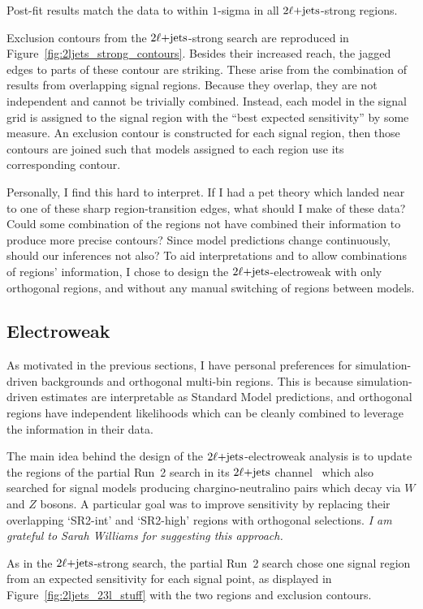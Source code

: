 Post-fit results match the data to within $1$-sigma in all $2\ell\mathrm{+jets}$-strong
regions.

Exclusion contours from the $2\ell\mathrm{+jets}$-strong search are reproduced in
Figure~\ref{fig:2ljets_strong_contours}.
Besides their increased reach, the jagged edges to parts of these contour are
striking.
These arise from the combination of results from overlapping signal regions.
Because they overlap, they are not independent and cannot be trivially
combined.
Instead, each model in the signal grid is assigned to the signal region
with the ``best expected sensitivity'' by some measure.
An exclusion contour is constructed for each signal region, then those contours
are joined such that models assigned to each region use its corresponding
contour.

Personally, I find this hard to interpret.
If I had a pet theory which landed near to one of these sharp
region-transition edges, what should I make of these data?
Could some combination of the regions not have combined their information to
produce more precise contours?
Since model predictions change continuously, should our inferences not also?
To aid interpretations and to allow combinations of regions'
information, I chose to design the $2\ell\mathrm{+jets}$-electroweak with only orthogonal
regions, and without any manual switching of regions between models.


\subsection{Electroweak}
\label{sec:2ljets_origins_electroweak}
As motivated in the previous sections, I have personal preferences for
simulation-driven backgrounds and orthogonal multi-bin regions.
This is because simulation-driven estimates are interpretable as
Standard Model predictions,
and orthogonal regions have independent likelihoods which can be cleanly
combined to leverage the information in their data.

The main idea behind the design of the $2\ell\mathrm{+jets}$-electroweak analysis is to
update the regions of the partial Run~2 search in its $2\ell\mathrm{+jets}$
channel~\cite{atlas_23l_SUSY_2016_24} which also searched for signal models
producing chargino-neutralino pairs which decay via $W$ and $Z$ bosons.
A particular goal was to improve sensitivity by replacing their overlapping
`SR2-int' and `SR2-high' regions with orthogonal selections.
\emph{I am grateful to Sarah Williams for suggesting this approach.}

As in the $2\ell\mathrm{+jets}$-strong search, the partial Run~2 search chose one
signal region from an expected sensitivity for each signal point,
as displayed in
Figure~\ref{fig:2ljets_23l_stuff}
with the two regions and exclusion contours.

